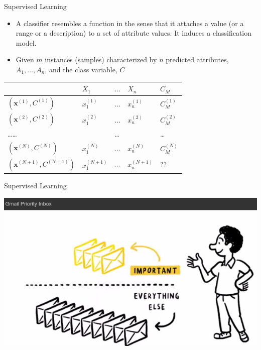 \documentclass{beamer}
\begin{document}
\begin{frame}{Supervised Learning}


\begin{itemize}
  \item A classifier resembles a function in the sense that it attaches a value (or a range or a description) to a set of attribute values. It induces a classification model.

  \item Given $m$ instances (samples) characterized by $n$ predicted attributes, $A_1, \ldots, A_n$, and the class variable, $C$

\end{itemize}
      
\begin{center}
\begin{tabular}{l|lll|l}
  & $X_1 $ & $\ldots$ & $X_n$ & $C_M$ \\
  \hline
$(\mathbf{x}^{(1)}, C^{(1)})$ & $x^{(1)}_1$ & $\ldots$ & $x^{(1)}_n$ & $C^{(1)}_M$ \\
$(\mathbf{x}^{(2)}, C^{(2)})$ & $x^{(2)}_1$ & $\ldots$ & $x^{(2)}_n$ & $C^{(2)}_M$ \\
\ldots\ldots 	 &		& \ldots 	&		& \ldots \\	
  \hline
$(\mathbf{x}^{(N)}, C^{(N)})$ & $x^{(N)}_1$ & $\ldots$ & $x^{(N)}_n$ & $C^{(N)}_M$ \\
\hline
$(\mathbf{x}^{(N+1)}, C^{(N+1)})$ & $x^{(N+1)}_1$ & $\ldots$ & $x^{(N+1)}_n$ & $??$ \\
\end{tabular}
\end{center}


\end{frame}

\begin{frame}{Supervised Learning}

\begin{center}
\includegraphics[width=.9\textwidth]{figs/selectionGmail}
\end{center}

\end{frame}
\end{document}
